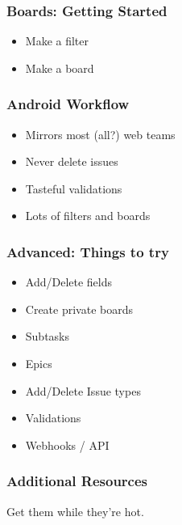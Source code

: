 \documentclass{beamer}
\begin{document}
\begin{frame}[fragile]
  \frametitle{Boards: Getting Started}

  \begin{itemize}
  \item{Make a filter}
  \item{Make a board}
  \end{itemize}
  
\end{frame}

\begin{frame}[fragile]
  \frametitle{Android Workflow}

  \begin{itemize}
  \item{Mirrors most (all?) web teams}
  \item{Never delete issues}
  \item{Tasteful validations}
  \item{Lots of filters and boards}
  \end{itemize}

\end{frame}

\begin{frame}[fragile]
  \frametitle{Advanced: Things to try}

  \begin{itemize}
  \item{Add/Delete fields}
  \item{Create private boards}
  \item{Subtasks}
  \item{Epics}
  \item{Add/Delete Issue types}
  \item{Validations}
  \item{Webhooks / API}
  \end{itemize}

\end{frame}

\begin{frame}[fragile]
  \frametitle{Additional Resources}

  Get them while they're hot.

  \begin{itemize}
  \item{\href{http://tolkiengateway.net/wiki/Palant\%C3\%ADri}{Palantiri on Tolkien Gateway.}}
  \item{\href{https://confluence.atlassian.com/display/JIRA/Configuring+Workflow}{Workflow Docs on JIRA}
  \end{itemize}

\end{frame}
\end{document}
